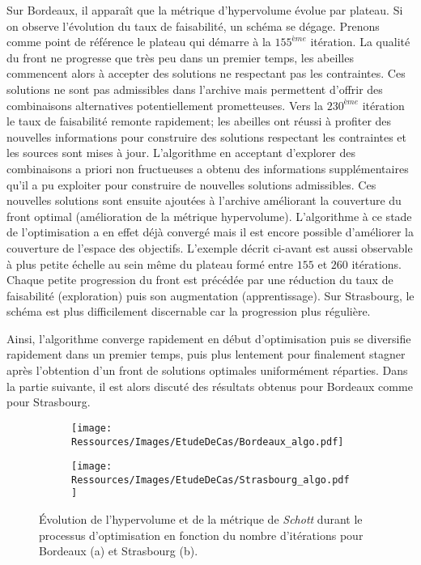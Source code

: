 Sur Bordeaux, il apparaît que la métrique d’hypervolume évolue par plateau. Si on observe
l’évolution du taux de faisabilité, un schéma se dégage. Prenons comme point de référence
le plateau qui démarre à la $155^{ème}$ itération. La qualité du front ne progresse que
très peu dans un premier temps, les abeilles commencent alors à accepter des solutions ne
respectant pas les contraintes. Ces solutions ne sont pas admissibles dans l’archive mais
permettent d’offrir des combinaisons alternatives potentiellement prometteuses. Vers la
$230^{ème}$ itération le taux de faisabilité remonte rapidement; les abeilles ont réussi à
profiter des nouvelles informations pour construire des solutions respectant les
contraintes et les sources sont mises à jour. L’algorithme en acceptant d’explorer des
combinaisons a priori non fructueuses a obtenu des informations supplémentaires
qu’il a pu exploiter pour construire de nouvelles solutions admissibles. Ces nouvelles
solutions sont ensuite ajoutées à l’archive améliorant la couverture du front optimal
(amélioration de la métrique hypervolume). L’algorithme à ce stade de l’optimisation a en
effet déjà convergé mais il est encore possible d’améliorer la couverture de l’espace des
objectifs.
L’exemple décrit ci-avant est aussi observable à plus petite échelle au sein même du plateau
formé entre $155$ et $260$ itérations. Chaque petite progression du front est précédée par
une réduction du taux de faisabilité (exploration) puis son augmentation (apprentissage).
Sur Strasbourg, le schéma est plus difficilement discernable car la progression plus régulière.

Ainsi, l’algorithme converge rapidement en début d’optimisation puis se diversifie
rapidement dans un premier temps, puis plus lentement pour finalement stagner après
l’obtention d’un front de solutions optimales uniformément réparties. Dans la partie
suivante, il est alors discuté des résultats obtenus pour Bordeaux comme pour
Strasbourg.

\begin{figure}
    \centering
    \begin{subfigure}[b]{0.48\textwidth}
        \centering
        \texttt{[image: Ressources/Images/EtudeDeCas/Bordeaux\_algo.pdf]}
        \caption{}
        \label{fig:hypervolume_schott_bor}
    \end{subfigure}
    \quad
    \begin{subfigure}[b]{0.48\textwidth}
        \centering
        \texttt{[image: Ressources/Images/EtudeDeCas/Strasbourg\_algo.pdf]}
        \caption{}
        \label{fig:hypervolume_schottstras}
    \end{subfigure}
    \caption[Évolution de la convergence et de la diversification de l’optimisation]
             {Évolution de l’hypervolume et de la métrique de \textit{Schott}
              durant le processus d’optimisation en fonction du nombre d’itérations pour
              Bordeaux (a) et Strasbourg (b).}
    \label{fig:hypervolume_schott_front}
\end{figure}


